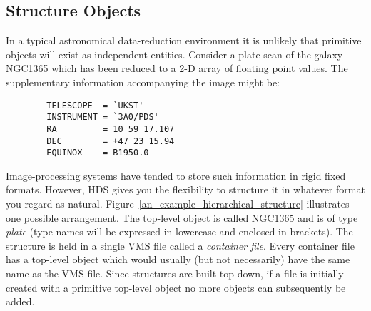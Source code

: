 \subsection {Structure Objects}

In a typical astronomical data-reduction environment it is unlikely that
primitive objects will exist as independent entities. Consider a plate-scan of
the galaxy NGC1365 which has been reduced to a 2-D array of floating point
values. The supplementary information accompanying the image might be:

\begin {verbatim}
        TELESCOPE  = `UKST'
        INSTRUMENT = `3A0/PDS'
        RA         = 10 59 17.107
        DEC        = +47 23 15.94
        EQUINOX    = B1950.0
\end{verbatim}

Image-processing systems have tended to store such information in rigid fixed
formats. However, HDS gives you the flexibility to structure it in whatever
format you regard as natural. Figure~\ref{an_example_hierarchical_structure}
illustrates one possible arrangement. The top-level object is called NGC1365
and is of type {\em plate} (type names will be expressed in lowercase and
enclosed in brackets). The structure is held in a single VMS file called a {\em
container file}. Every container file has a top-level object which would
usually (but not necessarily) have the same name as the VMS file. Since
structures are built top-down, if a file is initially created with a primitive
top-level object no more objects can subsequently be added. 

